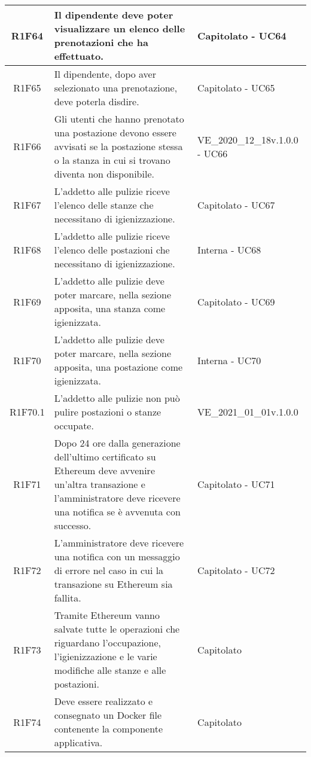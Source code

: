\begin{center}
\begin{longtable}{|c|p{10cm}|p{4cm}|}
		\hline	
		R1F64&Il dipendente deve poter visualizzare un elenco delle prenotazioni che ha effettuato. & Capitolato - UC64	\\
		\hline
		R1F65&Il dipendente, dopo aver selezionato una prenotazione, deve poterla disdire.	&Capitolato - UC65 	\\
		\hline
		R1F66&Gli utenti che hanno prenotato una postazione devono essere avvisati se la postazione stessa o la stanza in cui si trovano diventa non disponibile.	& VE\_2020\_12\_18v.1.0.0 - UC66	\\
		\hline

		R1F67&	L'addetto alle pulizie riceve l'elenco delle stanze che necessitano di igienizzazione.& 	Capitolato - UC67\\
		\hline
		R1F68&L'addetto alle pulizie riceve l'elenco delle postazioni che necessitano di igienizzazione.	& Interna - UC68	\\
		\hline
		R1F69&L'addetto alle pulizie deve poter marcare, nella sezione apposita, una stanza come igienizzata.	& Capitolato - UC69	\\
		\hline
		R1F70&L'addetto alle pulizie deve poter marcare, nella sezione apposita, una postazione come igienizzata.	&Interna - UC70 	\\
		\hline
		R1F70.1&L'addetto alle pulizie non può pulire postazioni o stanze occupate.	& VE\_2021\_01\_01v.1.0.0	\\
		\hline
		R1F71&Dopo 24 ore dalla generazione dell'ultimo certificato su Ethereum deve avvenire un'altra transazione e l'amministratore deve ricevere una notifica se è avvenuta con successo.	& Capitolato - UC71	\\
		\hline
		R1F72&L'amministratore deve ricevere una notifica con un messaggio di errore nel caso in cui la transazione su Ethereum sia fallita.	& Capitolato - UC72	\\
		\hline
		R1F73&Tramite Ethereum vanno salvate tutte le operazioni che riguardano l'occupazione, l'igienizzazione e le varie modifiche alle stanze e alle postazioni.	& Capitolato	\\
		\hline
		R1F74 &Deve essere realizzato e consegnato un Docker file contenente la componente applicativa. & Capitolato\\
		\hline
						
	\end{longtable}
\end{center}



